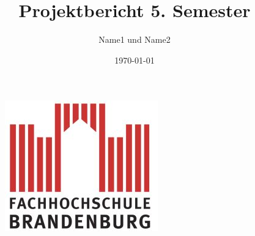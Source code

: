 \documentclass[a4paper,12pt]{scrartcl}
\title{Projektbericht 5. Semester}
\author{Name1 und Name2}
\date{\today}
\begin{document}
\maketitle 

\begin{figure}
  	\centering
    	\includegraphics[scale=0.25]{img/fhlogo.jpg}
\end{figure}


\newpage
\tableofcontents
\newpage


\newpage




\newpage

\newpage

\printglossaries
\end{document}
